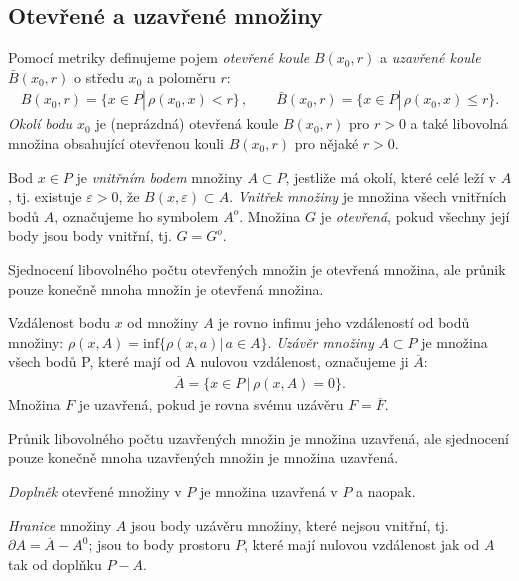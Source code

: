\subsection{Otevřené a uzavřené množiny}
\begin{definition}
Pomocí metriky definujeme pojem \textit{otevřené koule} $B(x_0,r)$ a \textit{uzavřené koule} $\bar{B}(x_0,r)$ o středu $x_0$ a poloměru $r$:
\begin{align*}
B(x_0,r)=\{x\in P |\, \rho(x_0,x)<r\}\,,\qquad \bar{B}(x_0,r)=\{x\in P |\, \rho(x_0,x)\leq r\}.
\end{align*}
\textit{Okolí bodu $x_0$} je (neprázdná) otevřená koule $B(x_0,r)$  pro $r>0$ a také libovolná množina obsahující otevřenou kouli $B(x_0,r)$ pro nějaké $r>0$.
\end{definition}
\begin{definition}
Bod $x\in P$ je \textit{vnitřním bodem} množiny $A\subset P$, jestliže má okolí, které celé leží v $A$, tj. existuje $\varepsilon>0$, že $B(x,\varepsilon)\subset A$. \textit{Vnitřek množiny} je množina všech vnitřních bodů $A$, označujeme ho symbolem $A^o$. Množina $G$ je \textit{otevřená}, pokud všechny její body jsou body vnitřní, tj. $G=G^o$.
\end{definition}
Sjednocení libovolného počtu otevřených množin je otevřená množina, ale průnik pouze konečně mnoha množin je  otevřená množina.
\begin{definition}
Vzdálenost bodu $x$ od množiny $A$ je rovno infimu jeho vzdáleností od bodů množiny: $\rho(x,A)=\text{inf}\{\rho(x,a)|\,a\in A\}$. \textit{Uzávěr množiny} $A\subset P$ je množina všech bodů P, které mají od A nulovou vzdálenost, označujeme ji $\overline{A}$:
\begin{align*}
\overline{A}=\{x\in P\,|\,\rho(x,A)=0\}.
\end{align*} 
Množina $F$ je uzavřená, pokud je rovna svému uzávěru $F=\overline{F}$.
\end{definition}
Průnik libovolného počtu uzavřených množin je  množina uzavřená, ale sjednocení pouze konečně mnoha uzavřených množin je množina uzavřená.
\begin{definition}
\textit{Doplněk} otevřené množiny v $P$ je množina uzavřená v $P$ a naopak.
\end{definition}
\begin{definition}
\textit{Hranice} množiny $A$ jsou body uzávěru množiny, které nejsou vnitřní, tj. $\partial A=\overline{A}-A^0$; jsou to body prostoru $P$, které mají nulovou vzdálenost jak od $A$ tak od doplňku $P-A$.
\end{definition}
